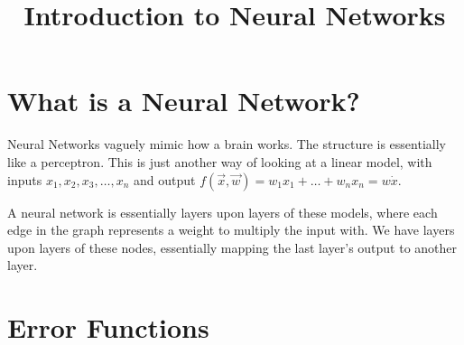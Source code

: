 \documentclass{article}
\title{Introduction to Neural Networks}
\begin{document}
\maketitle
\section{What is a Neural Network?}
Neural Networks vaguely mimic how a brain works. The structure is essentially
like a perceptron. 
This is just another way of looking at a linear model, with inputs $x_1, x_2,
x_3, \dots, x_n$ and output $f(\vec{x}, \vec{w}) = w_1x_1 + \dots + w_nx_n
= w \dot x$. 

A neural network is essentially layers upon layers of these models, 
where each edge in the graph represents a weight to multiply the input with. We
have layers upon layers of these nodes, essentially mapping the last layer's
output to another layer.


\section{Error Functions}
\end{document}
